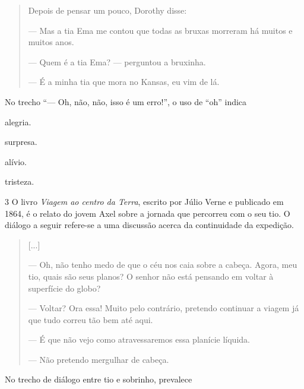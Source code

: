 \begin{conteudo}
\begin{conteudo}
\begin{conteudo}
\begin{conteudo}
\begin{quote}
Depois de pensar um pouco, Dorothy disse:

--- Mas a tia Ema me contou que todas as bruxas morreram há muitos e
muitos anos.

--- Quem é a tia Ema? --- perguntou a bruxinha.

--- É a minha tia que mora no Kansas, eu vim de lá.

\end{quote}

No trecho ``--- Oh, não, não, isso é um erro!'', o uso de ``oh'' indica

\begin{escolha}
\item alegria.

\item surpresa.

\item alívio.

\item tristeza.
\end{escolha}

\num{3} O livro \textit{Viagem ao centro da Terra}, escrito por Júlio Verne e
publicado em 1864, é o relato do jovem Axel sobre a jornada que
percorreu com o seu tio. O diálogo a seguir refere-se a uma discussão
acerca da continuidade da expedição.

\begin{quote}
{[}...{]}

--- Oh, não tenho medo de que o céu nos caia sobre a cabeça. Agora, meu
tio, quais são seus planos? O senhor não está pensando em voltar à
superfície do globo?

--- Voltar? Ora essa! Muito pelo contrário, pretendo continuar a viagem
já que tudo correu tão bem até aqui.

--- É que não vejo como atravessaremos essa planície líquida.

--- Não pretendo mergulhar de cabeça.
\end{quote}


No trecho de diálogo entre tio e sobrinho, prevalece


\end{conteudo}
\end{conteudo}
\end{conteudo}
\end{conteudo}
